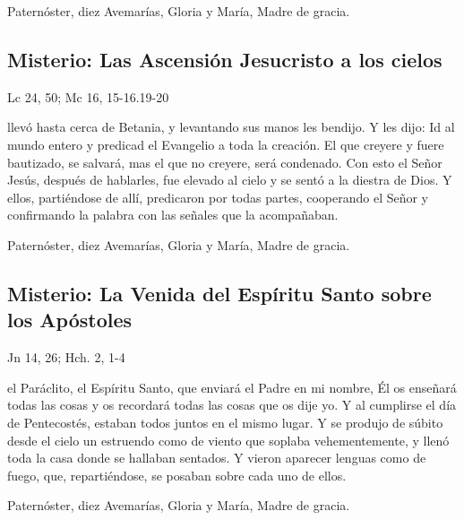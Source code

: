 \documentclass[10pt,a4paper,oneside]{book}
\newcounter{glorious-counter}
\begin{document}
\begin{center}
      Paternóster, diez Avemarías, Gloria y María, Madre de gracia.
\end{center}

\subsection*{ Misterio: Las Ascensión Jesucristo a los cielos}
\begin{flushright}
      {\color{red}Lc 24, 50; Mc 16, 15-16.19-20}
\end{flushright}
 llevó hasta cerca de Betania, y levantando sus manos les bendijo. Y les dijo: Id al mundo entero y predicad el Evangelio a toda la creación.
El que creyere y fuere bautizado, se salvará, mas el que no creyere, será condenado. Con esto el Señor Jesús, después de hablarles, fue elevado al cielo y se sentó a la diestra de Dios.
Y ellos, partiéndose de allí, predicaron por todas partes, cooperando el Señor y confirmando la palabra con las señales que la acompañaban.

\begin{center}
      Paternóster, diez Avemarías, Gloria y María, Madre de gracia.
\end{center}

\subsection*{ Misterio: La Venida del Espíritu Santo sobre los Apóstoles}
\begin{flushright}
      {\color{red}Jn 14, 26; Hch. 2, 1-4}
\end{flushright}
 el Paráclito, el Espíritu Santo, que enviará el Padre en mi nombre, Él os enseñará todas las cosas y os recordará todas las cosas que os dije yo.
Y al cumplirse el día de Pentecostés, estaban todos juntos en el mismo lugar. Y se produjo de súbito desde el cielo un estruendo como de viento que soplaba vehementemente,
y llenó toda la casa donde se hallaban sentados. Y vieron aparecer lenguas como de fuego, que, repartiéndose, se posaban sobre cada uno de ellos.

\begin{center}
      Paternóster, diez Avemarías, Gloria y María, Madre de gracia.
\end{center}
\end{document}
